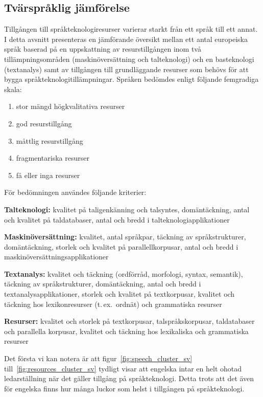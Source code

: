 \begin{multicols}{2}
\subsection{Tvärspråklig jämförelse}

Tillgången till språkteknologiresurser varierar starkt från ett språk
till ett annat. I detta avsnitt presenteras en jämförande översikt
mellan ett antal europeiska språk baserad på en uppskattning av
resurstillgången inom två tillämpningsområden (maskinöversättning och
talteknologi) och en basteknologi (text\-ana\-lys) samt av tillgången till
grundläggande resurser som behövs för att bygga
språkteknologitillämpningar. Språken bedömdes enligt följande
femgradiga skala:

\begin{enumerate}
\item stor mängd högkvalitativa resurser
\item god resurstillgång
\item måttlig resurstillgång
\item fragmentariska resurser
\item få eller inga resurser
\end{enumerate}

För bedömningen användes följande kriterier:

\textbf{Talteknologi:} kvalitet på taligenkänning och talsyntes,
domäntäckning, antal och kvalitet på taldatabaser, antal och bredd i
talteknologiapplikationer

\textbf{Maskinöversättning:} kvalitet, antal språkpar, täckning av
språkstrukturer, domäntäckning, storlek och kvalitet på
parallellkorpusar, antal och bredd i maskinöversättningsapplikationer

\textbf{Textanalys:} kvalitet och täckning (ordförråd, morfologi,
syntax, semantik), täckning av språkstrukturer, domäntäckning, antal
och bredd i textanalysapplikationer, storlek och kvalitet på
textkorpusar, kvalitet och täckning hos lexikonresurser (t.\,ex.~ordnät)
och grammatiska resurser

\textbf{Resurser:} kvalitet och storlek på textkorpusar,
talspråkskorpusar, taldatabaser och parallella korpusar, kvalitet och
täckning hos lexikaliska och grammatiska resurser


Det första vi kan notera är att figur~\ref{fig:speech_cluster_sv}
till~\ref{fig:resources_cluster_sv} tydligt visar att engelska intar
en helt ohotad ledarställning när det gäller tillgång på
språkteknologi. Detta trots att det även för engelska finns hur många
luckor som helst i tillgången på språkteknologi.


\end{multicols}
